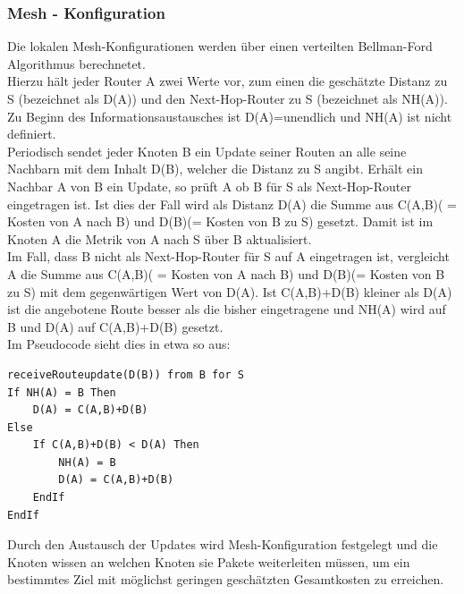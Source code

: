 \documentclass[10pt]{scrartcl}
\begin{document}
\subsubsection{Mesh - Konfiguration}
Die lokalen Mesh-Konfigurationen werden über einen verteilten Bellman-Ford Algorithmus berechnetet.\\
Hierzu hält jeder Router A zwei Werte vor, zum einen die geschätzte Distanz zu S (bezeichnet als D(A)) und den Next-Hop-Router zu S (bezeichnet als NH(A)). Zu Beginn des Informationsaustausches ist D(A)=unendlich und NH(A) ist nicht definiert.\\
Periodisch sendet jeder Knoten B ein Update seiner Routen an alle seine Nachbarn mit dem Inhalt D(B), welcher die Distanz zu S angibt. Erhält ein Nachbar A von B ein Update, so prüft A ob B für S als Next-Hop-Router eingetragen ist. Ist dies der Fall wird als Distanz D(A) die Summe aus C(A,B)( = Kosten von A nach B) und D(B)(= Kosten von B zu S) gesetzt. Damit ist im Knoten A die Metrik von A nach S über B aktualisiert.\\
Im Fall, dass B nicht als Next-Hop-Router für S auf A eingetragen ist, vergleicht A die Summe aus C(A,B)( = Kosten von A nach B) und D(B)(= Kosten von B zu S) mit dem gegenwärtigen Wert von D(A). Ist C(A,B)+D(B) kleiner als D(A) ist die angebotene Route besser als die bisher eingetragene und NH(A) wird auf B und D(A) auf C(A,B)+D(B) gesetzt.\\
Im Pseudocode sieht dies in etwa so aus:
\begin{lstlisting}
receiveRouteupdate(D(B)) from B for S
If NH(A) = B Then
	D(A) = C(A,B)+D(B)
Else
	If C(A,B)+D(B) < D(A) Then
		NH(A) = B
		D(A) = C(A,B)+D(B)
	EndIf
EndIf
\end{lstlisting}

Durch den Austausch der Updates wird Mesh-Konfiguration festgelegt und die Knoten wissen an welchen Knoten sie Pakete weiterleiten müssen, um ein bestimmtes Ziel mit möglichst geringen geschätzten Gesamtkosten zu erreichen.
\end{document}
